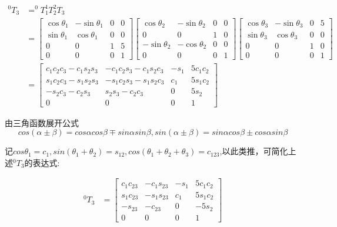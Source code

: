 \documentclass{ctexart}
\begin{document}
\begin{equation}
	\begin{aligned}
		^0T_3&=^0T_1^1T_2^2T_3\\
		&=\begin{bmatrix}
			\cos\theta_1 & -\sin\theta_1 & 0 & 0 \\
			\sin\theta_1 & \cos\theta_1 & 0 & 0 \\
			0 & 0 & 1 & 5 \\
			0 & 0 & 0 & 1
		\end{bmatrix}\begin{bmatrix}
			\cos\theta_2 & -\sin\theta_2 & 0 & 0 \\
			0 & 0 & 1 & 0 \\
			-\sin\theta_2 & -\cos\theta_2 & 0 & 0 \\
			0 & 0 & 0 & 1
		\end{bmatrix}\begin{bmatrix}
			\cos\theta_3 & -\sin\theta_3 & 0 & 5 \\
			\sin\theta_3 & \cos\theta_3 & 0 & 0 \\
			0 & 0 & 1 & 0 \\
			0 & 0 & 0 & 1	
		\end{bmatrix}\\
		&=\begin{bmatrix}
			c_1c_2c_3-c_1s_2s_3 & -c_1c_2s_3-c_1s_2c_3 & -s_1 & 5c_1c_2 \\
			s_1c_2c_3-s_1s_2s_3 & -s_1c_2s_3-s_1s_2c_3 & c_1 & 5s_1c_2 \\
			-s_2c_3-c_2s_3 & s_2s_3-c_2c_3 & 0 & 5s_2 \\
			0 & 0 & 0 & 1
		\end{bmatrix}
	\end{aligned}
\end{equation}

由三角函数展开公式
$$
cos(\alpha\pm\beta)=cos\alpha cos\beta\mp sin\alpha sin\beta,sin(\alpha\pm\beta)=sin\alpha cos\beta\pm cos\alpha sin\beta
$$

记$cos\theta_1=c_1,sin(\theta_1+\theta_2)=s_{12},cos(\theta_1+\theta_2+\theta_3)=c_{123}$,以此类推，可简化上述$^0T_3$的表达式:

\begin{equation}
	\begin{aligned}
		^0T_3&=\begin{bmatrix}
			c_{1}c_{23} & -c_{1}s_{23} & -s_1 & 5c_1c_2 \\
			s_{1}c_{23} & -s_{1}s_{23} & c_1 & 5s_1c_2 \\
			-s_{23} & -c_{23} & 0 & -5s_2 \\
			0 & 0 & 0 & 1
		\end{bmatrix}
	\end{aligned}
\end{equation}
\end{document}
